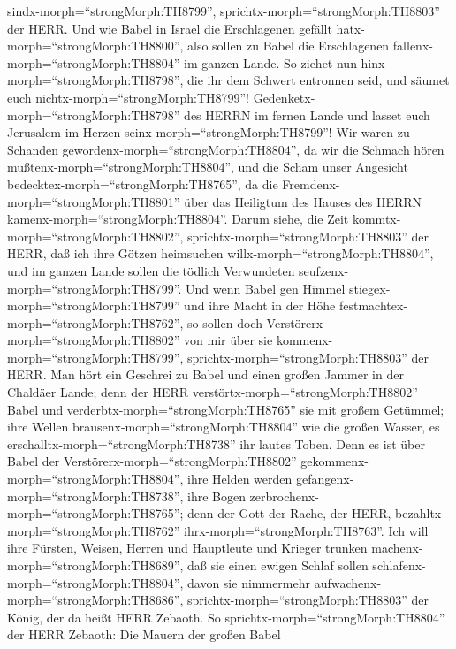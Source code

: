 sindx-morph=``strongMorph:TH8799'',
sprichtx-morph=``strongMorph:TH8803'' der HERR.  Und wie
Babel in Israel die Erschlagenen gefällt
hatx-morph=``strongMorph:TH8800'', also sollen zu Babel die Erschlagenen
fallenx-morph=``strongMorph:TH8804'' im ganzen Lande.  So
ziehet nun hinx-morph=``strongMorph:TH8798'', die ihr dem Schwert
entronnen seid, und säumet euch nichtx-morph=``strongMorph:TH8799''!
Gedenketx-morph=``strongMorph:TH8798'' des HERRN im fernen Lande und
lasset euch Jerusalem im Herzen seinx-morph=``strongMorph:TH8799''!
 Wir waren zu Schanden
gewordenx-morph=``strongMorph:TH8804'', da wir die Schmach hören
mußtenx-morph=``strongMorph:TH8804'', und die Scham unser Angesicht
bedecktex-morph=``strongMorph:TH8765'', da die
Fremdenx-morph=``strongMorph:TH8801'' über das Heiligtum des Hauses des
HERRN kamenx-morph=``strongMorph:TH8804''.  Darum siehe,
die Zeit kommtx-morph=``strongMorph:TH8802'',
sprichtx-morph=``strongMorph:TH8803'' der HERR, daß ich ihre Götzen
heimsuchen willx-morph=``strongMorph:TH8804'', und im ganzen Lande
sollen die tödlich Verwundeten seufzenx-morph=``strongMorph:TH8799''.
 Und wenn Babel gen Himmel
stiegex-morph=``strongMorph:TH8799'' und ihre Macht in der Höhe
festmachtex-morph=``strongMorph:TH8762'', so sollen doch
Verstörerx-morph=``strongMorph:TH8802'' von mir über sie
kommenx-morph=``strongMorph:TH8799'',
sprichtx-morph=``strongMorph:TH8803'' der HERR.  Man hört
ein Geschrei zu Babel und einen großen Jammer in der Chaldäer Lande;
 denn der HERR verstörtx-morph=``strongMorph:TH8802'' Babel
und verderbtx-morph=``strongMorph:TH8765'' sie mit großem Getümmel; ihre
Wellen brausenx-morph=``strongMorph:TH8804'' wie die großen Wasser, es
erschalltx-morph=``strongMorph:TH8738'' ihr lautes Toben. 
Denn es ist über Babel der Verstörerx-morph=``strongMorph:TH8802''
gekommenx-morph=``strongMorph:TH8804'', ihre Helden werden
gefangenx-morph=``strongMorph:TH8738'', ihre Bogen
zerbrochenx-morph=``strongMorph:TH8765''; denn der Gott der Rache, der
HERR, bezahltx-morph=``strongMorph:TH8762''
ihrx-morph=``strongMorph:TH8763''.  Ich will ihre Fürsten,
Weisen, Herren und Hauptleute und Krieger trunken
machenx-morph=``strongMorph:TH8689'', daß sie einen ewigen Schlaf sollen
schlafenx-morph=``strongMorph:TH8804'', davon sie nimmermehr
aufwachenx-morph=``strongMorph:TH8686'',
sprichtx-morph=``strongMorph:TH8803'' der König, der da heißt HERR
Zebaoth.  So sprichtx-morph=``strongMorph:TH8804'' der HERR
Zebaoth: Die Mauern der großen Babel
